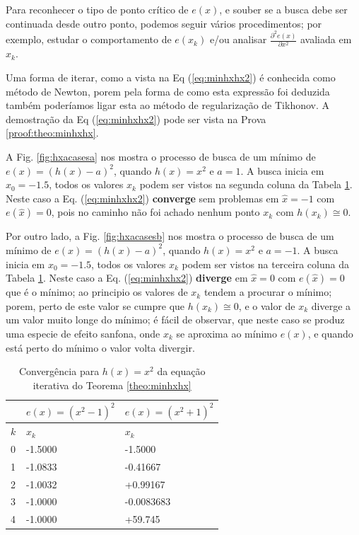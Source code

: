 \begin{theorem}
Para reconhecer o tipo de ponto crítico de $e(x)$, e souber se 
a busca debe ser continuada desde outro ponto, 
podemos seguir vários procedimentos; por exemplo, estudar o comportamento 
de $e(x_k)$ e/ou analisar  $\frac{\partial^2 e(x)}{\partial x^2}$ avaliada em $x_k$.

Uma forma de iterar, como a vista na Eq (\ref{eq:minhxhx2}) é conhecida como método de Newton,
porem pela forma de como esta expressão foi deduzida também poderíamos ligar esta ao
método de regularização de Tikhonov.
A demostração da Eq (\ref{eq:minhxhx2}) pode ser vista na Prova \ref{proof:theo:minhxhx}.
\end{theorem}



\begin{example}\label{ex:minhxhx}
 A Fig. \ref{fig:hxacasesa} nos mostra o processo de busca de um mínimo
 de $e(x)=(h(x)-a)^2$, quando $h(x)=x^2$ e $a=1$. A busca inicia em $x_0=-1.5$,
 todos os valores $x_{k}$ podem ser vistos na segunda coluna da
Tabela \ref{tab:hxacases}. Neste caso a Eq. (\ref{eq:minhxhx2}) \textbf{converge} sem problemas em $\hat{x}=-1$ com $e(\hat{x})=0$,
 pois no caminho não foi achado nenhum ponto $x_{k}$ com $h(x_{k})\cong 0$.

 Por outro lado, a Fig. \ref{fig:hxacasesb} nos mostra o processo de busca de um mínimo
 de $e(x)=(h(x)-a)^2$, quando $h(x)=x^2$ e $a=-1$. A busca inicia em $x_0=-1.5$,
 todos os valores $x_{k}$ podem ser vistos na terceira coluna da
Tabela \ref{tab:hxacases}. Neste caso a Eq. (\ref{eq:minhxhx2}) \textbf{diverge} 
em $\hat{x}=0$ com $e(\hat{x})=0$ que é o mínimo;
ao principio os valores de $x_{k}$ tendem a procurar o mínimo; porem,
perto de este valor se cumpre que $h(x_{k})\cong 0$, e o valor de $x_{k}$ diverge
a um valor muito longe do mínimo; é fácil de observar, que neste caso se produz 
uma especie de efeito sanfona, onde $x_{k}$ se aproxima ao mínimo $e(x)$, e quando 
está perto do mínimo o valor volta divergir.
\begin{table}[!h]
\centering
\begin{tabular}{|l|l|l|}
\hline
~&$e(x)=(x^2-1)^2$ & $e(x)=(x^2+1)^2$ \\ \hline
$k$&$x_k$  & $x_k$ \\ \hline
0&-1.5000  & -1.5000      \\
1&-1.0833  & -0.41667     \\
2&-1.0032  & +0.99167     \\
3&-1.0000  & -0.0083683   \\
4&-1.0000  & +59.745      \\  \hline
\end{tabular}
\caption{Convergência para $h(x)=x^2$ da equação iterativa do Teorema \ref{theo:minhxhx}}
\label{tab:hxacases}
\end{table}
\end{example}

